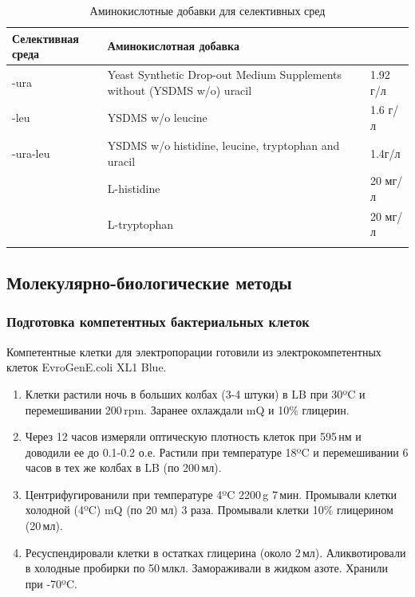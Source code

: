 \begin{table}[p]
	\footnotesize
	\caption{Аминокислотные добавки для селективных сред}
	\label{table:dropout}
	\begin{tabular}{p{0.3\width - \tabcolsep} p{0.6\width - 2\tabcolsep} p{0.1\width - \tabcolsep}}
	\graytable
	\toprule
	Селективная среда & Аминокислотная добавка & \\
	\midrule
	-ura & Yeast Synthetic Drop-out Medium Supplements without (YSDMS w/o) uracil & 1.92 г/л\\
	\thinrule
	-leu & YSDMS w/o leucine  & 1.6 г/л\\
	\thinrule
	-ura-leu & YSDMS w/o histidine, leucine, tryptophan and uracil  & 1.4г/л \\
		& L-histidine & 20 мг/л \\
		& L-tryptophan & 20 мг/л \\
		\\
	
	\bottomrule
	\end{tabular}
\end{table}



\subsection{Молекулярно-биологические методы}


\subsubsection{Подготовка компетентных бактериальных клеток}
\label{subsec:bac_comp}

Компетентные клетки для электропорации готовили из электрокомпетентных клеток EvroGen\texttrademark E.coli XL1 Blue.
 
\begin{enumerate}[nolistsep]
	\item Клетки растили ночь в больших колбах (3-4 штуки) в LB при 30ºC и перемешивании 200\,rpm. Заранее охлаждали mQ и 10\% глицерин. 
	\item Через 12 часов измеряли оптическую плотность клеток при 595\,нм и доводили ее до 0.1-0.2 о.е. Растили при температуре 18ºC и перемешивании 6 часов в тех же колбах в LB (по 200\,мл).
	\item  Центрифугированили при температуре 4ºC  2200\,g 7\,мин. Промывали клетки холодной (4ºC) mQ (по 20 мл) 3 раза. Промывали клетки 10\% глицерином (20\,мл). 
	\item Ресуспендировали клетки в остатках глицерина (около 2\,мл). Аликвотировали в холодные пробирки по 50\,млкл. Замораживали в жидком азоте. Хранили при -70ºC.

\end{enumerate}

